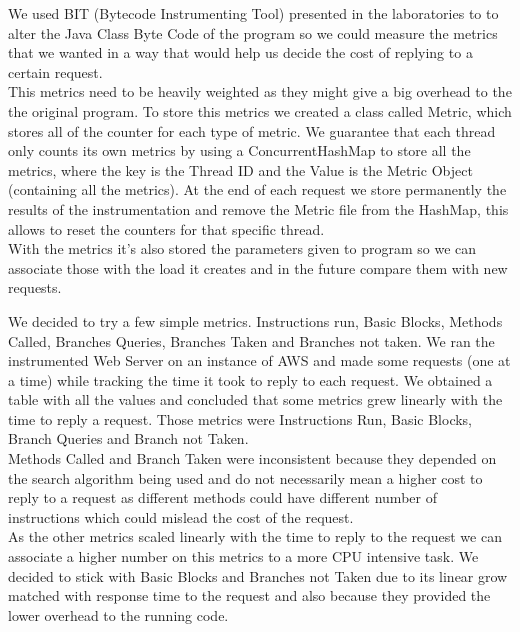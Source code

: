 \documentclass[times, 10pt,twocolumn]{article}
\begin{document}
   We used BIT (Bytecode Instrumenting Tool) presented in the laboratories to 
   to alter the Java Class Byte Code of the program so we could measure the metrics
   that we wanted in a way that would help us decide the cost of replying to a certain request.\\
   This metrics need to be heavily weighted as they might give a big overhead to the 
   the original program. To store this metrics we created a class called Metric, which
   stores all of the counter for each type of metric. We guarantee that each thread only 
   counts its own metrics by using a ConcurrentHashMap to store all the metrics, where the 
   key is the Thread ID and the Value is the Metric Object (containing all the metrics). At 
   the end of each request we store permanently the results of the instrumentation and remove
   the Metric file from the HashMap, this allows to reset the counters for that specific thread.\\
   With the metrics it's also stored the parameters given to program so we can associate those with
   the load it creates and in the future compare them with new requests.


   We decided to try a few simple metrics. Instructions run, Basic Blocks, 
   Methods Called, Branches Queries, Branches Taken and Branches not taken. 
   We ran the instrumented Web Server on an instance of AWS and made some requests 
   (one at a time) while tracking the time it took to reply to each request.
   We obtained a table with all the values and concluded that some metrics grew
   linearly with the time to reply a request. Those metrics were Instructions
   Run, Basic Blocks, Branch Queries and Branch not Taken.\\
   Methods Called and Branch Taken were inconsistent because they depended on 
   the search algorithm being used and do not necessarily mean a higher cost to 
   reply to a request as different methods could have different number of instructions
   which could mislead the cost of the request.\\
   As the other metrics scaled linearly with the time to reply to the request we can
   associate a higher number on this metrics to a more CPU intensive task.
   We decided to stick with Basic Blocks and Branches not Taken due to its 
   linear grow matched with response time to the request and also because they provided
   the lower overhead to the running code. 
\end{document}
